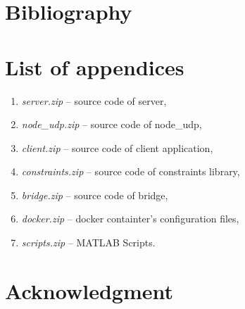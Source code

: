 \chapter{Bibliography}


\printbibliography[type=article,heading=subbibliography,title={Literature}]
\printbibliography[type=online,heading=subbibliography,title={Online}]




\chapter*{List of appendices}

\begin{enumerate}
	\item \textit{server.zip} -- source code of server,
	\item \textit{node\_udp.zip} -- source code of node\_udp,
	\item \textit{client.zip} -- source code of client application,
	\item \textit{constraints.zip} -- source code of constraints library,
	\item \textit{bridge.zip} -- source code of bridge,
	\item \textit{docker.zip} -- docker containter's configuration files,
	\item \textit{scripts.zip} -- MATLAB Scripts.
\end{enumerate}
\thispagestyle{empty}

\chapter*{Acknowledgment}

